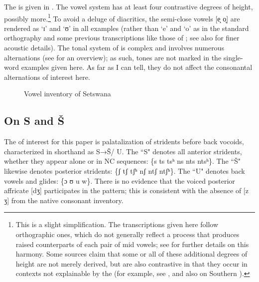 The  is given in  \citep{Bennett2016}. The vowel system has at least four contrastive degrees of height, possibly more.\footnote{This is a slight simplification. The transcriptions given here follow  orthographic ones, which do not generally reflect a  process that produces raised counterparts of each pair of mid vowels; see \citet{Dichabe1997} for further details on this harmony. Some sources claim that some or all of these additional degrees of height are not merely derived, but are also contrastive in that they occur in contexts not explainable by the  (for example, see \citealt{chebanneetal1997,Creissels2005emergence}, and also \citealt{Khabanyane1991} on Southern ).} To avoid a deluge of diacritics, the semi-close vowels [e̝ o̝] are rendered as ‘ɪ’ and ‘ʊ’ in all examples (rather than ‘e’ and ‘o’ as in the standard orthography and some previous transcriptions like those of \citealt{Cole1955}; see also \citealt{Roux2008} for finer acoustic details). The tonal system of  is complex and involves numerous alternations (see \citealt{chebanneetal1997} for an overview); as such, tones are not marked in the single-word examples given here. As far as I can tell, they do not affect the consonantal alternations of interest here.

   
\begin{figure}
\begin{vowel}
\end{vowel}
\caption{Vowel inventory of Setswana \citep{Bennett2016}}
\label{fig:bennett:1}
\end{figure} 

\subsection{On S and Š}\label{sec:bennett:2.2}

The  of interest for this paper is palatalization of stridents before back vocoids, characterized in shorthand as S→Š/ {\longrule} U. The ``S" denotes all anterior stridents, whether they appear alone or in NC sequences: \{s ts tsʰ ns nts ntsʰ\}. The ``Š" likewise denotes posterior stridents: \{ʃ tʃ tʃʰ nʃ ntʃ ntʃʰ\}. The ``U" denotes back vowels and glides: \{ɔ ʊ u w\}. There is no evidence that the voiced posterior affricate [dʒ] participates in the pattern; this is consistent with the absence of [z ʒ] from the native consonant inventory.

